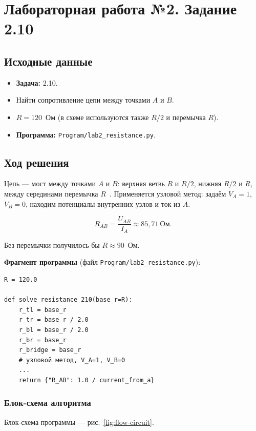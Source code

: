 \documentclass[12pt,a4paper]{scrartcl}
\begin{document}

\section{Лабораторная работа №2. Задание 2.10}

\subsection{Исходные данные}

\begin{itemize}
 \item \textbf{Задача:} 2.10.
 \item Найти сопротивление цепи между точками $A$ и $B$.
 \item $R=120$~Ом (в схеме используются также $R/2$ и перемычка $R$).
 \item \textbf{Программа:} \texttt{Program/lab2\_resistance.py}.
\end{itemize}

\subsection{Ход решения}

Цепь --- мост между точками $A$ и $B$: верхняя ветвь $R$ и $R/2$, нижняя $R/2$ и $R$, между серединами перемычка $R$~\cite{Trofimov-2015}. Применяется узловой метод: задаём $V_A=1$, $V_B=0$, находим потенциалы внутренних узлов и ток из $A$.

\[
R_{AB}=\frac{U_{AB}}{I_A}\approx 85{,}71~\text{Ом}.
\]

Без перемычки получилось бы $R\approx 90$~Ом.

\textbf{Фрагмент программы} (файл \texttt{Program/lab2\_resistance.py}):
\begin{verbatim}
R = 120.0

def solve_resistance_210(base_r=R):
    r_tl = base_r
    r_tr = base_r / 2.0
    r_bl = base_r / 2.0
    r_br = base_r
    r_bridge = base_r
    # узловой метод, V_A=1, V_B=0
    ...
    return {"R_AB": 1.0 / current_from_a}
\end{verbatim}

\subsubsection{Блок-схема алгоритма}

Блок-схема программы --- рис.~\ref{fig:flow-circuit}.
\end{document}
